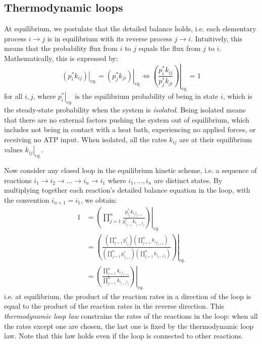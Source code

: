 \subsection{Thermodynamic loops}
    At equilibrium, we postulate that the detailed balance holds, i.e. each elementary process $i\to j$ is in equilibrium with its reverse process $j\to i$. Intuitively, this means that the probability flux from $i$ to $j$ equals the flux from $j$ to $i$. Mathematically, this is expressed by:
    \begin{equation}
        \left.\left(p_i^*k_{ij}\right)\right|_{eq.} = \left.\left(p_j^*k_{ji}\right)\right|_{eq.} 
        \Leftrightarrow \left.\left(\frac{p_i^*k_{ij}}{p_j^*k_{ji}}\right)\right|_{eq.} = 1
    \end{equation}
    for all $i,j$, where $\left.p_i^*\right|_{eq.}$ is the equilibrium probability of being in state $i$, which is the steady-state probability when the system is \emph{isolated}. Being isolated means that there are no external factors pushing the system out of equilibrium, which includes not being in contact with a heat bath, experiencing no applied forces, or receiving no ATP input. When isolated, all the rates $k_{ij}$ are at their equilibrium values $\left.k_{ij}\right|_{eq.}$.
    
    Now consider any closed loop in the equilibrium kinetic scheme, i.e. a sequence of reactions $i_1\to i_2\to\dots\to i_n\to i_1$ where $i_1,\dots,i_n$ are distinct states. By multiplying together each reaction's detailed balance equation in the loop, with the convention $i_{n+1}=i_1$, we obtain:
    \begin{equation}
    \label{eq:thermo-loop-law}
    \begin{split}
        1
        &= \left.\left(\prod_{j=1}^n \frac{p_{i_j}^*k_{i_ji_{j+1}}}{p_{i_{j+1}}^*k_{i_{j+1}i_j}}\right)\right|_{eq.} \\
        &= \left.\left(\frac{\left(\prod_{j=1}^n p_{i_j}^*\right)\left(\prod_{j=1}^n k_{i_ji_{j+1}}\right)}{\left(\prod_{j=1}^n p_{i_{j+1}}^*\right)\left(\prod_{j=1}^n k_{i_{j+1}i_j}\right)}\right)\right|_{eq.} \\
        &= \left.\left(\frac{\prod_{j=1}^n k_{i_ji_{j+1}}}{\prod_{j=1}^n k_{i_{j+1}i_j}}\right)\right|_{eq.}
    \end{split}
    \end{equation}
    i.e. at equilibrium, the product of the reaction rates in a direction of the loop is equal to the product of the reaction rates in the reverse direction. This \emph{thermodynamic loop law} constrains the rates of the reactions in the loop: when all the rates except one are chosen, the last one is fixed by the thermodynamic loop law. Note that this law holds even if the loop is connected to other reactions.

